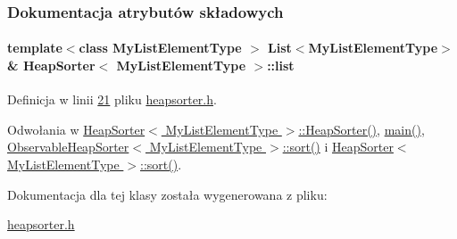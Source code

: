 \subsubsection{Dokumentacja atrybutów składowych}
\hypertarget{class_heap_sorter_a6b8ac615ff2de0c2e510ad215d0508d9}{
\paragraph[{list}]{\setlength{\rightskip}{0pt plus 5cm}template$<$class My\-List\-Element\-Type $>$ {\bf List}$<$My\-List\-Element\-Type$>$\& {\bf Heap\-Sorter}$<$ My\-List\-Element\-Type $>$\-::list}}\label{class_heap_sorter_a6b8ac615ff2de0c2e510ad215d0508d9}


Definicja w linii \hyperlink{heapsorter_8h_source_l00021}{21} pliku \hyperlink{heapsorter_8h_source}{heapsorter.\-h}.



Odwołania w \hyperlink{heapsorter_8h_source_l00026}{Heap\-Sorter$<$ My\-List\-Element\-Type $>$\-::\-Heap\-Sorter()}, \hyperlink{main_8cpp_source_l00022}{main()}, \hyperlink{observableheapsorter_8h_source_l00026}{Observable\-Heap\-Sorter$<$ My\-List\-Element\-Type $>$\-::sort()} i \hyperlink{heapsorter_8h_source_l00042}{Heap\-Sorter$<$ My\-List\-Element\-Type $>$\-::sort()}.



Dokumentacja dla tej klasy została wygenerowana z pliku\-:\begin{DoxyCompactItemize}
\item 
\hyperlink{heapsorter_8h}{heapsorter.\-h}\end{DoxyCompactItemize}
